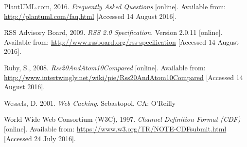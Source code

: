 \documentclass{article}
\begin{document}
\begin{thebibliography}{9}
PlantUML.com, 2016.
\textit{Frequently Asked Questions} [online].
Available from: \url{http://plantuml.com/faq.html} [Accessed 14 August 2016].

RSS Advisory Board, 2009.
\textit{RSS 2.0 Specification}. Version 2.0.11 [online].
Available from: \url{http://www.rssboard.org/rss-specification} [Accessed 14 August 2016].

Ruby, S., 2008.
\textit{Rss20AndAtom10Compared} [online].
Available from: \url{http://www.intertwingly.net/wiki/pie/Rss20AndAtom10Compared} [Accessed 14 August 2016].

Wessels, D. 2001.
\textit{Web Caching}.
Sebastopol, CA: O'Reilly

World Wide Web Consortium (W3C), 1997.
\textit{Channel Definition Format (CDF)} [online].
Available from: \url{https://www.w3.org/TR/NOTE-CDFsubmit.html}
[Accessed 24 July 2016].

\end{thebibliography}
\end{document}
